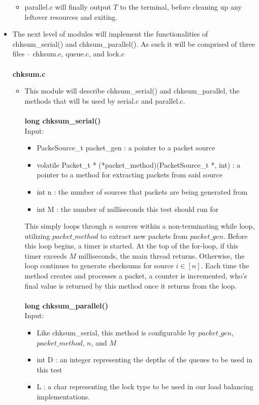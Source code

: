 \documentclass[]{article}
\begin{document}
\begin{itemize}
\begin{itemize}
		\item parallel.c will finally output $T$ to the terminal, before cleaning up any leftover resources and exiting.
	\end{itemize}
	\item The next level of modules will implement the functionalities of chksum\_serial() and chksum\_parallel(). As such it will be comprised of three files -- chksum.c, queue.c, and lock.c
	\\\\
	\textbf{chksum.c}
	\begin{itemize}
		\item This module will describe chksum\_serial() and chksum\_parallel, the methods that will bs used by serial.c and parallel.c.
		\\\\
		\textbf{long chksum\_serial()}
		\\
		Input:
		\begin{itemize}
			\item PackeSource\_t packet\_gen : a pointer to a packet source
			\item volatile Packet\_t * (*packet\_method)(PacketSource\_t *, int) : a pointer to a method for extracting packets from said source
			\item int n : the number of sources that packets are being generated from
			\item int M : the number of milliseconds this test should run for
		\end{itemize}
		This simply loops through $n$ sources within a non-terminating while loop, utilizing $packet\_method$ to extract new packets from $packet\_gen$. Before this loop begins, a timer is started. At the top of the for-loop, if this timer exceeds $M$ milliseconds, the main thread returns. Otherwise, the loop continues to generate checksums for source $i \in [n]$. Each time the method creates and processes a packet, a counter is incremented, who's final value is returned by this method once it returns from the loop.
		\\\\
		\textbf{long chksum\_parallel()}
		\\
		Input:
		\begin{itemize}
			\item Like chksum\_serial, this method is configurable by $packet\_gen$, $packet\_method$, $n$, and $M$
			\item int D : an integer representing the depths of the queues to be used in this test
			\item L : a char representing the lock type to be used in our load balancing implementations.

\end{itemize}
\end{itemize}
\end{itemize}
\end{document}
